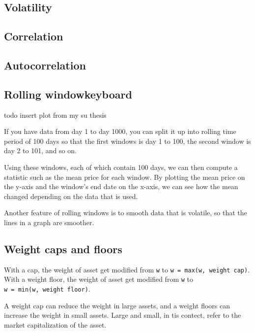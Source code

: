 \documentclass[12,]{article}
\begin{document}
\subsection{Volatility}\label{volatility}

\subsection{Correlation}\label{correlation}

\subsection{Autocorrelation}\label{autocorrelation}

\subsection{Rolling windowkeyboard}\label{rolling-windowkeyboard}

todo insert plot from my su thesis

If you have data from day 1 to day 1000, you can split it up into
rolling time period of 100 days so that the first windows is day 1 to
100, the second window is day 2 to 101, and so on.

Using these windows, each of which contain 100 days, we can then compute
a statistic such as the mean price for each window. By plotting the mean
price on the y-axis and the window's end date on the x-axis, we can see
how the mean changed depending on the data that is used.

Another feature of rolling windows is to smooth data that is volatile,
so that the lines in a graph are smoother.

\subsection{Weight caps and floors}\label{weight-caps-and-floors}

With a cap, the weight of asset get modified from
\texttt{w\textquotesingle{}} to
\texttt{w\ =\ max(w\textquotesingle{},\ weight\ cap)}. With a weight
floor, the weight of asset get modified from
\texttt{w\textquotesingle{}} to
\texttt{w\ =\ min(w\textquotesingle{},\ weight\ floor)}.

A weight cap can reduce the weight in large assets, and a weight floors
can increase the weight in small assets. Large and small, in tis
contect, refer to the market capitalization of the asset.
\end{document}
